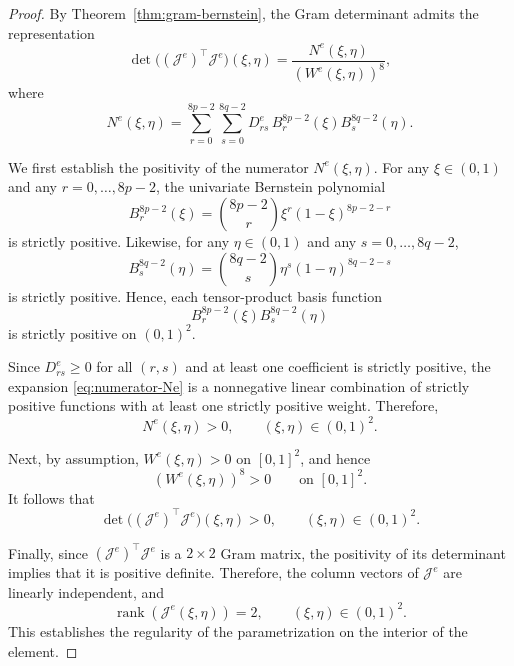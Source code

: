 \documentclass[10pt,a4paper]{amsart}
\begin{document}
\begin{proof}
By Theorem~\ref{thm:gram-bernstein}, the Gram determinant admits the representation
\begin{equation}
\det\!\big((\bm{\mathcal{J}}^e)^\top\bm{\mathcal{J}}^e\big)(\xi,\eta)
=
\frac{N^e(\xi,\eta)}{(W^e(\xi,\eta))^8},
\end{equation}
where
\begin{equation}
N^e(\xi,\eta)
=
\sum_{r=0}^{8p-2}\sum_{s=0}^{8q-2}
D_{rs}^e\, B_r^{8p-2}(\xi) B_s^{8q-2}(\eta).
\label{eq:numerator-Ne}
\end{equation}

We first establish the positivity of the numerator $N^e(\xi,\eta)$. 
For any $\xi\in(0,1)$ and any $r=0,\dots,8p-2$, the univariate Bernstein polynomial
\begin{equation}
B_r^{8p-2}(\xi)=\binom{8p-2}{r}\xi^r(1-\xi)^{8p-2-r}
\end{equation}
is strictly positive. Likewise, for any $\eta\in(0,1)$ and any $s=0,\dots,8q-2$,
\begin{equation}
B_s^{8q-2}(\eta)=\binom{8q-2}{s}\eta^s(1-\eta)^{8q-2-s}
\end{equation}
is strictly positive. Hence, each tensor-product basis function
\begin{equation}
B_r^{8p-2}(\xi)B_s^{8q-2}(\eta)
\end{equation}
is strictly positive on $(0,1)^2$.

Since $D_{rs}^e\ge 0$ for all $(r,s)$ and at least one coefficient is strictly positive, the expansion \eqref{eq:numerator-Ne} is a nonnegative linear combination of strictly positive functions with at least one strictly positive weight. Therefore,
\begin{equation}
N^e(\xi,\eta)>0,
\qquad
(\xi,\eta)\in(0,1)^2.
\end{equation}

Next, by assumption, $W^e(\xi,\eta)>0$ on $[0,1]^2$, and hence
\begin{equation}
(W^e(\xi,\eta))^8>0
\qquad\text{on }[0,1]^2.
\end{equation}
It follows that
\begin{equation}
\det\!\big((\bm{\mathcal{J}}^e)^\top\bm{\mathcal{J}}^e\big)(\xi,\eta)>0,
\qquad
(\xi,\eta)\in(0,1)^2.
\end{equation}

Finally, since $(\bm{\mathcal{J}}^e)^\top\bm{\mathcal{J}}^e$ is a $2\times 2$ Gram matrix, 
the positivity of its determinant implies that it is positive definite. 
Therefore, the column vectors of $\bm{\mathcal{J}}^e$ are linearly independent, and
\begin{equation}
\operatorname{rank}(\bm{\mathcal{J}}^e(\xi,\eta))=2,
\qquad
(\xi,\eta)\in(0,1)^2.
\end{equation}
This establishes the regularity of the parametrization on the interior of the element.
\end{proof}
\end{document}
